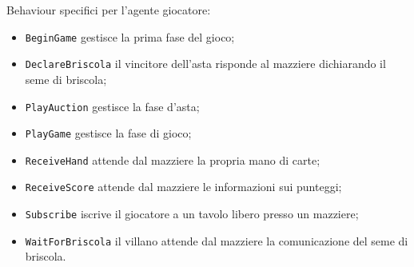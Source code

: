 Behaviour specifici per l'agente giocatore:

\begin{itemize}
   \item \texttt{BeginGame} gestisce la prima fase del gioco;
   \item \texttt{DeclareBriscola} il vincitore dell'asta risponde al mazziere dichiarando il seme di briscola;
   \item \texttt{PlayAuction} gestisce la fase d'asta;
   \item \texttt{PlayGame} gestisce la fase di gioco;
   \item \texttt{ReceiveHand} attende dal mazziere la propria mano di carte;
   \item \texttt{ReceiveScore} attende dal mazziere le informazioni sui punteggi;
   \item \texttt{Subscribe} iscrive il giocatore a un tavolo libero presso un mazziere;
   \item \texttt{WaitForBriscola} il villano attende dal mazziere la comunicazione del seme di briscola.
\end{itemize}


